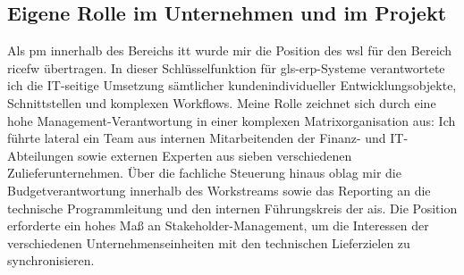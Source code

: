 \subsection{Eigene Rolle im Unternehmen und im Projekt}
\label{subsec:EigeneRolle}

\par Als \gls{pm} innerhalb des Bereichs \gls{itt} wurde mir die Position des \gls{wsl} für den Bereich \gls{ricefw} übertragen. In dieser Schlüsselfunktion für \gls{gls-erp}-Systeme verantwortete ich die IT-seitige Umsetzung sämtlicher kundenindividueller Entwicklungsobjekte, Schnittstellen und komplexen Workflows. Meine Rolle zeichnet sich durch eine hohe Management-Verantwortung in einer komplexen Matrixorganisation aus: Ich führte lateral ein Team aus internen Mitarbeitenden der Finanz- und IT-Abteilungen sowie externen Experten aus sieben verschiedenen Zulieferunternehmen. Über die fachliche Steuerung hinaus oblag mir die Budgetverantwortung innerhalb des Workstreams sowie das Reporting an die technische Programmleitung und den internen Führungskreis der \gls{ais}. Die Position erforderte ein hohes Maß an Stakeholder-Management, um die Interessen der verschiedenen Unternehmenseinheiten mit den technischen Lieferzielen zu synchronisieren.



